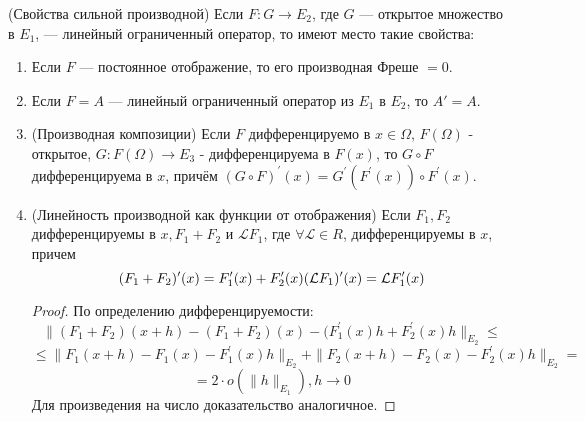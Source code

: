 \begin{theorem} (Свойства сильной производной)
	Если $F \colon G \to E_2$, где $G$ --- открытое множество в $E_1$, --- линейный ограниченный оператор, то имеют место такие свойства:
	\begin{enumerate}
	    \item Если $F$ --- постоянное отображение, то его производная Фреше $=0$.

	    \item Если $F = A$ --- линейный ограниченный оператор из $E_1$ в $E_2$, то $A'=A$.
	    
	    \item (Производная композиции) Если $F$ дифференцируемо в $x \in \Omega$, $F(\Omega)$ - открытое, $G \colon F(\Omega) \to E_3$ - дифференцируема в $F(x)$, то $G \circ F$ дифференцируема в $x$, причём $(G \circ F)^\prime (x) = G^\prime(F^\prime (x)) \circ F^\prime (x)$.

	    \item (Линейность производной как функции от отображения) Если $F_1, F_2$ дифференцируемы в $x, F_1+F_2$ и $\mathcal{L} F_1$, где $\forall \mathcal{L} \in R$, дифференцируемы в $x$, причем 
	    \[
	        (F_1+F_2)^\prime (x) = F^\prime_1 (x)+F^\prime_2 (x)\\
	        (\mathcal{L} F_1)^\prime (x) = \mathcal{L} F^\prime_1(x)
	    \]
	    \begin{proof}
	        По определению дифференцируемости$\colon$ 
	        \[
	            \|(F_1+F_2)(x+h) - (F_1+F_2)(x) - (F_1^\prime(x) h + F^\prime_2(x) h \|_{E_2} \leq
	        \]
	        \[
	            \leq \|F_1 (x+h) - F_1 (x) - F^\prime_1(x)h\|_{E_2} + \|F_2(x+h) - F_2(x) - F^\prime_2(x)h\|_{E_2} =
	        \]
	        \[
	            = 2\cdot o(\|h\|_{E_1}), h \to 0
	        \]
	        Для произведения на число доказательство аналогичное.
	    \end{proof}
	\end{enumerate}
\end{theorem}


